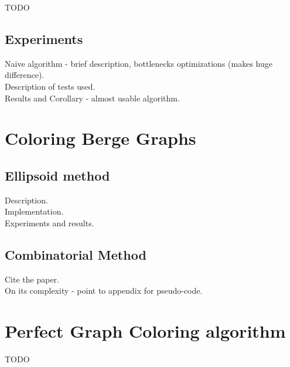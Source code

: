 \documentclass{article}
\begin{document}
TODO

\subsection{Experiments}

Naive algorithm - brief description, bottlenecks optimizations (makes huge difference).\\

Description of tests used.\\

Results and Corollary - almost usable algorithm.



\section{Coloring Berge Graphs}

\subsection{Ellipsoid method}

Description.\\

Implementation.\\

Experiments and results.\\

\subsection{Combinatorial Method}

Cite the paper.\\

On its complexity - point to appendix for pseudo-code.

\appendix
\appendixpage
\addappheadtotoc

\section{Perfect Graph Coloring algorithm}
TODO


% 
\printbibliography
\end{document}
